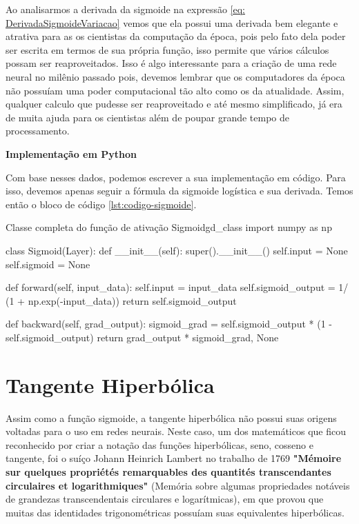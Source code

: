 Ao analisarmos a derivada da sigmoide na expressão \ref{eq: DerivadaSigmoideVariacao} vemos que ela possui uma derivada bem elegante e atrativa para as os cientistas da computação da época, pois pelo fato dela poder ser escrita em termos de sua própria função, isso permite que vários cálculos possam ser reaproveitados. Isso é algo interessante para a criação de uma rede neural no milênio passado pois, devemos lembrar que os computadores da época não possuíam uma poder computacional tão alto como os da atualidade. Assim, qualquer calculo que pudesse ser reaproveitado e até mesmo simplificado, já era de muita ajuda para os cientistas além de poupar grande tempo de processamento.

\textbf{Implementação em Python}

Com base nesses dados, podemos escrever a sua implementação em código. Para isso, devemos apenas seguir a fórmula da sigmoide logística e sua derivada. Temos então o bloco de código \ref{lst:codigo-sigmoide}.

\begin{codelisting}{Classe completa do função de ativação Sigmoid}{gd_class}
import numpy as np

class Sigmoid(Layer):
    def __init__(self):
        super().__init__()
        self.input = None
        self.sigmoid = None

    def forward(self, input_data):
        self.input = input_data
        self.sigmoid_output = 1/ (1 + np.exp(-input_data))
        return self.sigmoid_output

    def backward(self, grad_output):
        sigmoid_grad = self.sigmoid_output * (1 - self.sigmoid_output)
        return grad_output * sigmoid_grad, None
\end{codelisting}

\section{Tangente Hiperbólica}

Assim como a função sigmoide, a tangente hiperbólica não possui suas origens voltadas para o uso em redes neurais. Neste caso, um dos matemáticos que ficou reconhecido por criar a notação das funções hiperbólicas, seno, cosseno e tangente, foi o suíço Johann Heinrich Lambert no trabalho de 1769 \textbf{"Mémoire sur quelques propriétés remarquables des quantités transcendantes circulaires et logarithmiques"} (Memória sobre algumas propriedades notáveis de grandezas transcendentais circulares e logarítmicas), em que provou que muitas das identidades trigonométricas possuíam suas equivalentes hiperbólicas.

